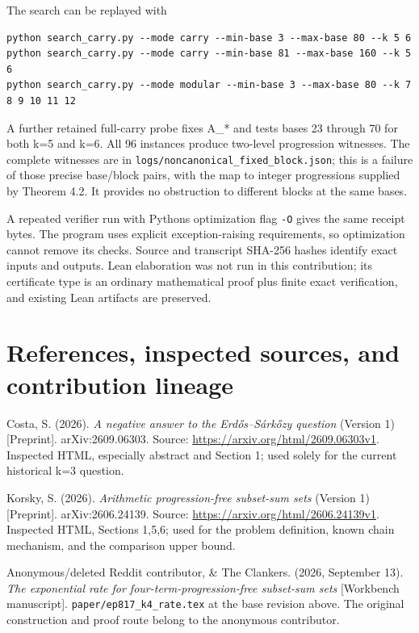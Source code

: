 The search can be replayed with

\begin{Verbatim}[breaklines=true,breakanywhere=true,fontsize=\footnotesize]
python search_carry.py --mode carry --min-base 3 --max-base 80 --k 5 6
python search_carry.py --mode carry --min-base 81 --max-base 160 --k 5 6
python search_carry.py --mode modular --min-base 3 --max-base 80 --k 7 8 9 10 11 12
\end{Verbatim}

A further retained full-carry probe fixes A\_* and tests bases 23 through 70 for both k=5 and k=6. All 96 instances produce two-level progression witnesses. The complete witnesses are in \nolinkurl{logs/noncanonical_fixed_block.json}; this is a failure of those precise base/block pairs, with the map to integer progressions supplied by Theorem 4.2. It provides no obstruction to different blocks at the same bases.

A repeated verifier run with Python\textquotesingle s optimization flag \texttt{-O} gives the same receipt bytes. The program uses explicit exception-raising requirements, so optimization cannot remove its checks. Source and transcript SHA-256 hashes identify exact inputs and outputs. Lean elaboration was not run in this contribution; its certificate type is an ordinary mathematical proof plus finite exact verification, and existing Lean artifacts are preserved.

\section{References, inspected sources, and contribution lineage}\label{n03-references-inspected-sources-and-contribution-lineage}

Costa, S. (2026). \emph{A negative answer to the Erdős--Sárkőzy question} (Version 1) {[}Preprint{]}. arXiv:2609.06303. Source: \url{https://arxiv.org/html/2609.06303v1}. Inspected HTML, especially abstract and Section 1; used solely for the current historical k=3 question.

Korsky, S. (2026). \emph{Arithmetic progression-free subset-sum sets} (Version 1) {[}Preprint{]}. arXiv:2606.24139. Source: \url{https://arxiv.org/html/2606.24139v1}. Inspected HTML, Sections 1,5,6; used for the problem definition, known chain mechanism, and the comparison upper bound.

Anonymous/deleted Reddit contributor, \& The Clankers. (2026, September 13). \emph{The exponential rate for four-term-progression-free subset-sum sets} {[}Workbench manuscript{]}. \texttt{paper/ep817\_k4\_rate.tex} at the base revision above. The original construction and proof route belong to the anonymous contributor.

